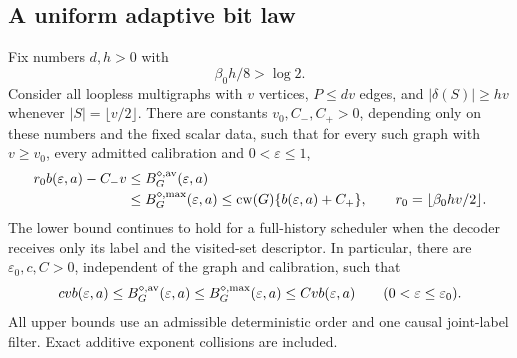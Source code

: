 \subsection{A uniform adaptive bit law}
\begin{theorem}
\label{thm:v28-size-uniform}
Fix numbers $d,h>0$ with
\begin{equation}\label{eq:v28-expansion-margin}
                       \beta_0h/8>\log 2.
\end{equation}
Consider all loopless multigraphs with $v$ vertices, $P\le d v$ edges,
and $|\delta(S)|\ge h v$ whenever $|S|=\lfloor v/2\rfloor$.
There are constants $v_0,C_-,C_+>0$, depending only on these numbers
and the fixed scalar data, such that for every such graph with
$v\ge v_0$, every admitted calibration and $0<\varepsilon\le1$,
\begin{equation}\label{eq:v28-additive-bit-law}
 \begin{split}
 r_0 b(\varepsilon,a)-C_-v
 &\le B^{\diamond,\rm av}_G(\varepsilon,a)\\
 &\le B^{\diamond,\rm max}_G(\varepsilon,a)
 \le \operatorname{cw}(G)\{b(\varepsilon,a)+C_+\},
 \qquad r_0=\lfloor\beta_0 h v/2\rfloor .
 \end{split}
\end{equation}
The lower bound continues to hold for a full-history scheduler when
the decoder receives only its label and the visited-set descriptor.
In particular, there are $\varepsilon_0,c,C>0$, independent of the
graph and calibration, such that
\begin{equation}\label{eq:v28-multiplicative-bit-law}
 c v b(\varepsilon,a)
 \le B^{\diamond,\rm av}_G(\varepsilon,a)
 \le B^{\diamond,\rm max}_G(\varepsilon,a)
 \le C v b(\varepsilon,a)
                   \qquad(0<\varepsilon\le\varepsilon_0).
\end{equation}
All upper bounds use an admissible deterministic order and one causal
joint-label filter. Exact additive exponent collisions are included.
\end{theorem}

